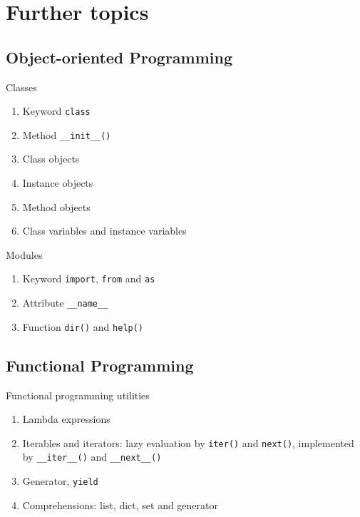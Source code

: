 \documentclass[english, nochinese]{../TeXTemplate/pkuslide}
\begin{document}
\section{Further topics}

\begin{frame}
\sectionpage
\end{frame}

\subsection{Object-oriented Programming}

\begin{frame}
\sectionpage
\end{frame}

\begin{frame}[fragile]{Classes}
\begin{enumerate}
\item Keyword \verb"class"
\item Method \verb"__init__()"
\item Class objects
\item Instance objects
\item Method objects
\item Class variables and instance variables
\end{enumerate}
\end{frame}

\begin{frame}[fragile]{Modules}
\begin{enumerate}
\item Keyword \verb"import", \verb"from" and \verb"as"
\item Attribute \verb"__name__"
\item Function \verb"dir()" and \verb"help()"
\end{enumerate}
\end{frame}

\subsection{Functional Programming}

\begin{frame}[fragile]{Functional programming utilities}
\begin{enumerate}
\item Lambda expressions
\item Iterables and iterators: lazy evaluation by \verb"iter()" and \verb"next()", implemented by \verb"__iter__()" and \verb"__next__()"
\item Generator, \verb"yield"
\item Comprehensions: list, dict, set and generator
\end{enumerate}
\end{frame}
\end{document}
